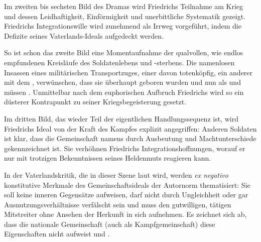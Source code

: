 
Im zweiten bis sechsten Bild des Dramas wird Friedrichs Teilnahme am Krieg und
dessen Leidhaftigkeit, Einförmigkeit und unerbittliche Systematik
gezeigt. Friedrichs Integrationswille wird zunehmend als Irrweg vorgeführt,
indem die Defizite seines Vaterlands-Ideals aufgedeckt werden.

So ist schon das zweite Bild eine \Cite{traumferne} Momentaufnahme der
qualvollen, wie endlos empfundenen Kreisläufe des Soldatenlebens und
-sterbens. Die namenlosen Insassen eines militärischen Transportzuges, einer
davon totenköpfig, ein anderer mit dem \Cite{Antlitz Friedrichs}, verwünschen,
dass sie überhaupt geboren wurden und nun als \Cite{ewig geängstigte Kinder}
\Cite{ewig fahren} und \Cite{ewig verwesen} müssen . 
Unmittelbar nach dem euphorischen Aufbruch Friedrichs wird so ein düsterer
Kontrapunkt zu seiner Kriegsbegeisterung gesetzt.

Im dritten Bild, das wieder Teil der eigentlichen Handlungssequenz ist, wird
Friedrichs Ideal von der \Cite{einenden} Kraft des Kampfes explizit
angegriffen: Anderen Soldaten ist klar, dass die Gemeinschaft namens
\Cite{Vaterland} durch Ausbeutung und Machtunterschiede gekennzeichnet
ist. Sie verhöhnen Friedrichs Integrationshoffnungen,  worauf er nur mit trotzigen Bekenntnissen seines Heldenmuts
reagieren kann.

In der Vaterlandskritik, die in dieser Szene laut wird, werden \emph{ex
  negativo} konstitutive Merkmale des Gemeinschaftsideals der Autornorm
thematisiert: Sie soll keine inneren Gegensätze aufweisen, darf nicht durch
Ungleichheit oder gar Ausnutzungsverhältnisse verfälscht sein und muss den
gutwilligen, tätigen Mitstreiter ohne Ansehen der Herkunft in sich
aufnehmen.  Es zeichnet sich ab, dass die nationale Gemeinschaft (auch als
Kampfgemeinschaft) diese Eigenschaften nicht aufweist und \Cite{der Krieg
  nicht die Überwindung von Klassen- und Gruppengegensätzen, sondern ihren
  Fortbestand bedeutet}.

